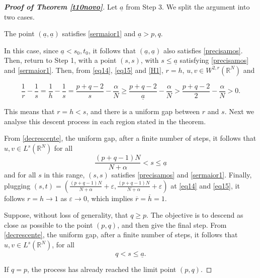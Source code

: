 \documentclass[12pt,a4paper]{article}
\numberwithin{equation}{section}
\begin{document}
\begin{proof}[\bf{Proof of Theorem \ref{t10novo}}]
 








 Let $\underline{a}$ from Step 3. We split the argument into two cases. 
\medbreak

 The point $(\underline{a}, \underline{a})$ satisfies \eqref{sermaior1} and $\underline{a}> p,q$.

In this case, since $\underline{a} < s_0, t_0$, it follows that $(\underline{a}, \underline{a})$ also satisfies \eqref{precisamos}.  Then, return to Step 1, with a point $(s, s)$, with $s\leq \underline{a}$ satisfying \eqref{precisamos} and \eqref{sermaior1}. Then, from \eqref{eq14}, \eqref{eq15} and \eqref{H1}, $r= h$, $u, v \in W^{2, r}(\mathbb{R}^N)$ and 

\begin{equation}\label{decrescente}
\dfrac{1}{r}-\dfrac{1}{s}= \dfrac{1}{h} - \dfrac{1}{s}= \dfrac{p+q-2}{s}-\dfrac{\alpha}{N}\geq \dfrac{p+q-2}{\underline{a}}-\dfrac{\alpha}{N} > \dfrac{p+q-2}{2}-\dfrac{\alpha}{N}>  0.
\end{equation}

This means that $r=h<s$, and there is a uniform gap between $r$ and $s$. Next we analyse this descent process in each region stated in the theorem.

\medbreak

 From \eqref{decrescente}, the uniform gap, after a finite number of steps, it follows that $u,v \in L^{s}(\mathbb{R}^N)$ for all 
$$\frac{(p+q-1)N}{N+\alpha} < s \leq \underline{a}$$
and for all $s$ in this range, $(s,s)$ satisfies  \eqref{precisamos} and \eqref{sermaior1}. Finally, plugging \linebreak $(s,t) = \left( \frac{(p+q-1)N}{N+\alpha} +\varepsilon,\frac{(p+q-1)N}{N+\alpha} +\varepsilon \right)$ at \eqref{eq14} and \eqref{eq15}, it follows $r=h\to 1$ as $\varepsilon \to 0$, which implies  $\overline{r} = \overline{h}=1$.

\medbreak

 Suppose, without loss of generality, that $q\geq p$. The objective is to descend as close as possible to the point $(p,q)$, and then give the final step. From \eqref{decrescente}, the uniform gap, after a finite number of steps, it follows that $u,v \in L^{s}(\mathbb{R}^N)$, for all 
\[
q < s \leq \underline{a}.
\]

If $q=p$, the process has already reached the limit point $(p,q)$. 


\end{proof}
\end{document}
